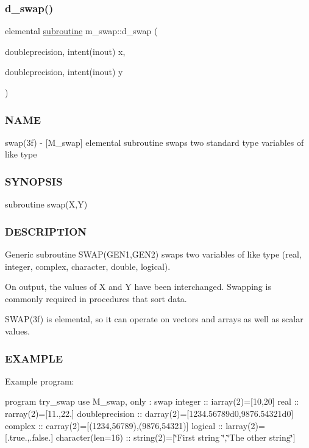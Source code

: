 \subsubsection{\texorpdfstring{d\+\_\+swap()}{d\_swap()}}
{\footnotesize\ttfamily elemental \hyperlink{M__stopwatch_83_8txt_acfbcff50169d691ff02d4a123ed70482}{subroutine} m\+\_\+swap\+::d\+\_\+swap (\begin{DoxyParamCaption}\item[{doubleprecision, intent(inout)}]{x,  }\item[{doubleprecision, intent(inout)}]{y }\end{DoxyParamCaption})\hspace{0.3cm}{\ttfamily [private]}}



\subsubsection*{N\+A\+ME}

swap(3f) -\/ \mbox{[}M\+\_\+swap\mbox{]} elemental subroutine swaps two standard type variables of like type \subsubsection*{S\+Y\+N\+O\+P\+S\+IS}

subroutine swap(\+X,\+Y) \subsubsection*{D\+E\+S\+C\+R\+I\+P\+T\+I\+ON}

Generic subroutine S\+W\+A\+P(\+G\+E\+N1,\+G\+E\+N2) swaps two variables of like type (real, integer, complex, character, double, logical).

On output, the values of X and Y have been interchanged. Swapping is commonly required in procedures that sort data.

S\+W\+A\+P(3f) is elemental, so it can operate on vectors and arrays as well as scalar values.

\subsubsection*{E\+X\+A\+M\+P\+LE}

Example program\+:

program try\+\_\+swap use M\+\_\+swap, only \+: swap integer \+:\+: iarray(2)=\mbox{[}10,20\mbox{]} real \+:\+: rarray(2)=\mbox{[}11.,22.\mbox{]} doubleprecision \+:\+: darray(2)=\mbox{[}1234.\+56789d0,9876.\+54321d0\mbox{]} complex \+:\+: carray(2)=\mbox{[}(1234,56789),(9876,54321)\mbox{]} logical \+:\+: larray(2)=\mbox{[}.true.,.false.\mbox{]} character(len=16) \+:\+: string(2)=\mbox{[}\char`\"{}\+First string    \char`\"{},\char`\"{}\+The other string\char`\"{}\mbox{]}

